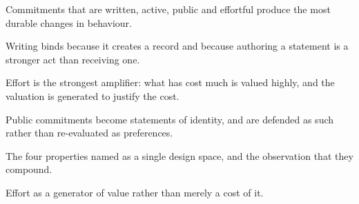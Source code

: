 

\begin{distilled}
  \item Commitments that are written, active, public and effortful produce the most durable changes in behaviour.
  \item Writing binds because it creates a record and because authoring a statement is a stronger act than receiving one.
  \item Effort is the strongest amplifier: what has cost much is valued highly, and the valuation is generated to justify the cost.
  \item Public commitments become statements of identity, and are defended as such rather than re-evaluated as preferences.
\end{distilled}

\begin{unique}
  \item The four properties named as a single design space, and the observation that they compound.
  \item Effort as a generator of value rather than merely a cost of it.
\end{unique}
